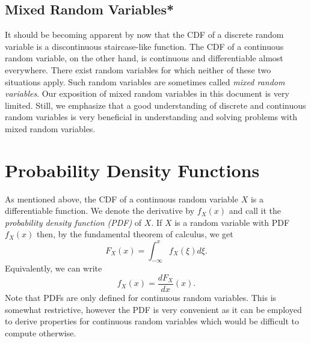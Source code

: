 \subsection{Mixed Random Variables*}

It should be becoming apparent by now that the CDF of a discrete random variable is a discontinuous staircase-like function.
The CDF of a continuous random variable, on the other hand, is continuous and differentiable almost everywhere.
There exist random variables for which neither of these two situations apply.
Such random variables are sometimes called \emph{mixed random variables}. 
Our exposition of mixed random variables in this document is very limited.
Still, we emphasize that a good understanding of discrete and continuous random variables is very beneficial in understanding and solving problems with mixed random variables.


\section{Probability Density Functions}

As mentioned above, the CDF of a continuous random variable $X$ is a differentiable function.
We denote the derivative by $f_X (x)$ and call it the \emph{probability density function (PDF)} of $X$. 
If $X$ is a random variable with PDF $f_X (x)$ then, by the fundamental theorem of calculus, we get
\begin{equation*}
F_X (x) = \int_{- \infty}^x f_X (\xi) d\xi .
\end{equation*}
Equivalently, we can write
\begin{equation*}
f_X (x) = \frac{d F_X}{dx} (x) .
\end{equation*}
Note that PDFs are only defined for continuous random variables.
This is somewhat restrictive, however the PDF is very convenient as it can be employed to derive properties for continuous random variables which would be difficult to compute otherwise.

